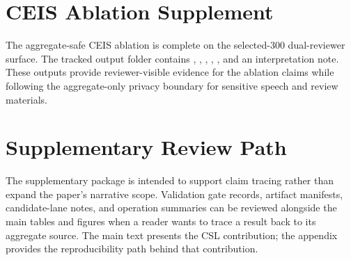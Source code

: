 \section{CEIS Ablation Supplement}
\label{app:ceis_ablation_supplement}

The aggregate-safe CEIS ablation is complete on the selected-300 dual-reviewer surface. The tracked output folder contains , , , , , and an interpretation note. These outputs provide reviewer-visible evidence for the ablation claims while following the aggregate-only privacy boundary for sensitive speech and review materials.

\section{Supplementary Review Path}
\label{app:supplementary_review_path}

The supplementary package is intended to support claim tracing rather than expand the paper's narrative scope. Validation gate records, artifact manifests, candidate-lane notes, and operation summaries can be reviewed alongside the main tables and figures when a reader wants to trace a result back to its aggregate source. The main text presents the CSL contribution; the appendix provides the reproducibility path behind that contribution.
